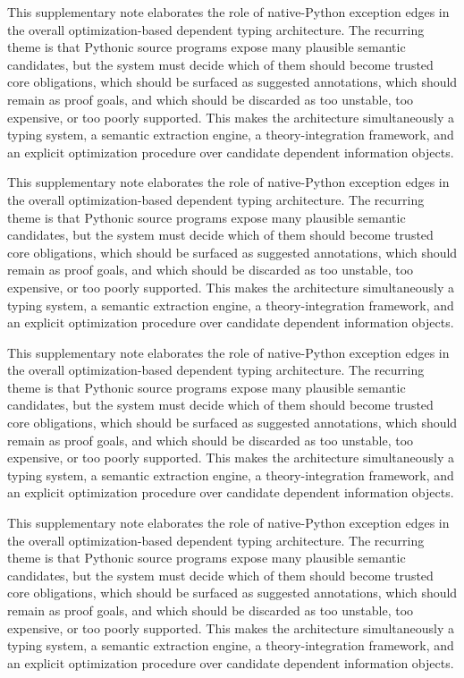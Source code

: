 \documentclass[11pt]{article}
\theoremstyle{definition}
\theoremstyle{plain}
\begin{document}
This supplementary note elaborates the role of native-Python exception edges in the overall
optimization-based dependent typing architecture. The recurring theme is that
Pythonic source programs expose many plausible semantic candidates, but the
system must decide which of them should become trusted core obligations, which
should be surfaced as suggested annotations, which should remain as proof
goals, and which should be discarded as too unstable, too expensive, or too
poorly supported. This makes the architecture simultaneously a typing system,
a semantic extraction engine, a theory-integration framework, and an explicit
optimization procedure over candidate dependent information objects.

This supplementary note elaborates the role of native-Python exception edges in the overall
optimization-based dependent typing architecture. The recurring theme is that
Pythonic source programs expose many plausible semantic candidates, but the
system must decide which of them should become trusted core obligations, which
should be surfaced as suggested annotations, which should remain as proof
goals, and which should be discarded as too unstable, too expensive, or too
poorly supported. This makes the architecture simultaneously a typing system,
a semantic extraction engine, a theory-integration framework, and an explicit
optimization procedure over candidate dependent information objects.

This supplementary note elaborates the role of native-Python exception edges in the overall
optimization-based dependent typing architecture. The recurring theme is that
Pythonic source programs expose many plausible semantic candidates, but the
system must decide which of them should become trusted core obligations, which
should be surfaced as suggested annotations, which should remain as proof
goals, and which should be discarded as too unstable, too expensive, or too
poorly supported. This makes the architecture simultaneously a typing system,
a semantic extraction engine, a theory-integration framework, and an explicit
optimization procedure over candidate dependent information objects.

This supplementary note elaborates the role of native-Python exception edges in the overall
optimization-based dependent typing architecture. The recurring theme is that
Pythonic source programs expose many plausible semantic candidates, but the
system must decide which of them should become trusted core obligations, which
should be surfaced as suggested annotations, which should remain as proof
goals, and which should be discarded as too unstable, too expensive, or too
poorly supported. This makes the architecture simultaneously a typing system,
a semantic extraction engine, a theory-integration framework, and an explicit
optimization procedure over candidate dependent information objects.
\end{document}
